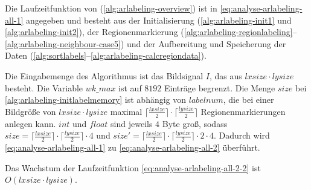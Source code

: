 Die Laufzeitfunktion von  (\autoref{alg:arlabeling-overview}) ist in
 \autoref{eq:analyse-arlabeling-all-1} angegeben und besteht aus der Initialisierung (\autoref{alg:arlabeling-init1}
 und \autoref{alg:arlabeling-init2}), der Regionenmarkierung
 (\autoref{alg:arlabeling-regionlabeling}--\autoref{alg:arlabeling-neighbour-case5}) und der Aufbereitung und
 Speicherung der Daten (\autoref{alg:sortlabels}--\autoref{alg:arlabeling-calcregiondata}).

Die Eingabemenge des Algorithmus ist das Bildsignal $I$, das aus $\mathit{lxsize} \cdot \mathit{lysize}$ besteht. Die
 Variable $\mathit{wk\_max}$ ist auf $8192$ Einträge begrenzt. Die Menge $\mathit{size}$ bei
 \autoref{alg:arlabeling-initlabelmemory} ist abhängig von $\mathit{labelnum}$, die bei einer Bildgröße von
 $\mathit{lxsize} \cdot \mathit{lysize}$ maximal $\bigl\lceil\frac{\mathit{lxsize}}{2}\bigr\rceil
 \cdot \bigl\lceil\frac{\mathit{lysize}}{2}\bigr\rceil$ Regionenmarkierungen anlegen kann.
 $\mathit{int}$ und $\mathit{float}$ sind jeweils $4$ Byte groß, sodass
 $\mathit{size} = \bigl\lceil\frac{\mathit{lxsize}}{2}\bigr\rceil \cdot \bigl\lceil\frac{\mathit{lysize}}{2}\bigr\rceil
 \cdot 4$ und $\mathit{size}' = \bigl\lceil\frac{\mathit{lxsize}}{2}\bigr\rceil
 \cdot \bigl\lceil\frac{\mathit{lysize}}{2}\bigr\rceil \cdot 2 \cdot 4$.
Dadurch wird \autoref{eq:analyse-arlabeling-all-1} zu \autoref{eq:analyse-arlabeling-all-2} überführt.

Das Wachstum der Laufzeitfunktion \autoref{eq:analyse-arlabeling-all-2-2} ist $O(\mathit{lxsize\cdot\mathit{lysize}})$.
